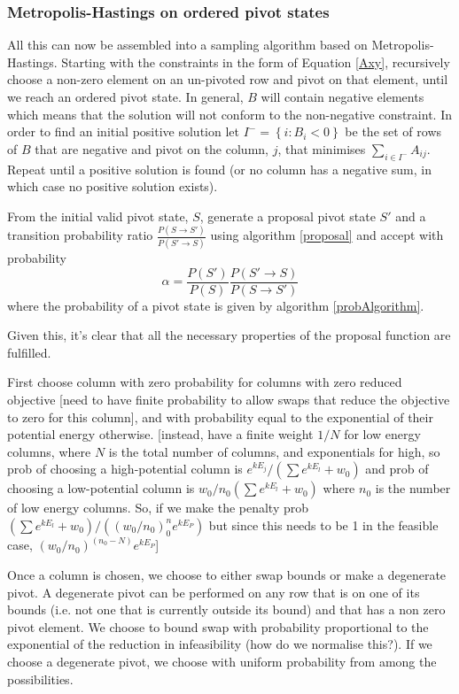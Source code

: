 \documentclass{article}
\begin{document}
\subsubsection{Metropolis-Hastings on ordered pivot states}

All this can now be assembled into a sampling algorithm based on Metropolis-Hastings. Starting with the constraints in the form of Equation \eqref{Axy}, recursively choose a non-zero element on an un-pivoted row and pivot on that element, until we reach an ordered pivot state. In general, $B$ will contain negative elements which means that the solution will not conform to the non-negative constraint. In order to find an initial positive solution let $I^- = \left\{i: B_i < 0\right\}$ be the set of rows of $B$ that are negative and pivot on the column, $j$, that minimises $\sum_{i\in I^-}A_{ij}$. Repeat until a positive solution is found (or no column has a negative sum, in which case no positive solution exists).

From the initial valid pivot state, $S$, generate a proposal pivot state $S'$ and a transition probability ratio $\frac{P(S\rightarrow S')}{P(S' \rightarrow S)}$ using algorithm \ref{proposal} and accept with probability
\[
\alpha = \frac{P(S')}{P(S)}\frac{P(S'\rightarrow S)}{P(S \rightarrow S')}
\]
where the probability of a pivot state is given by algorithm \ref{probAlgorithm}.

Given this, it's clear that all the necessary properties of the proposal function are fulfilled.



First choose column with zero probability for columns with zero reduced objective [need to have finite probability to allow swaps that reduce the objective to zero for this column], and with probability equal to the exponential of their potential energy otherwise. [instead, have a finite weight $1/N$ for low energy columns, where $N$ is the total number of columns, and exponentials for high, so prob of choosing a high-potential column is $e^{kE_j}/(\sum e^{kE_l} + w_0)$ and prob of choosing a low-potential column is $w_0/n_0(\sum e^{kE_l} + w_0)$ where $n_0$ is the number of low energy columns. So, if we make the penalty prob $(\sum e^{kE_l} + w_0)/((w_0/n_0)^n_0e^{kE_P})$ but since this needs to be 1 in the feasible case, $(w_0/n_0)^(n_0-N)e^{kE_P}$]

Once a column is chosen, we choose to either swap bounds or make a degenerate pivot. A degenerate pivot can be performed on any row that is on one of its bounds (i.e. not one that is currently outside its bound) and that has a non zero pivot element. We choose to bound swap with probability proportional to the exponential of the reduction in infeasibility (how do we normalise this?). If we choose a degenerate pivot, we choose with uniform probability from among the possibilities.
\end{document}
